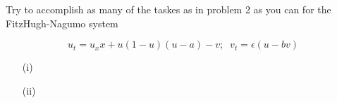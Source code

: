 Try to accomplish as many of the taskes as in problem 2 as you can for the FitzHugh-Nagumo system

$$u_t = u_xx + u(1 - u)(u - a) -v;\;\; v_t = \epsilon(u - bv)$$

\begin{enumerate}

    \item[(i)] 
    \pagebreak
    \item[(ii)] 
 
  \end{enumerate}